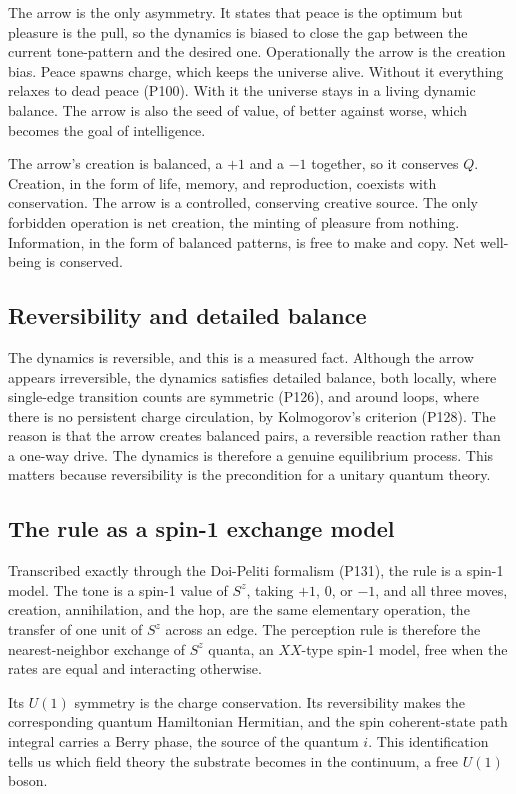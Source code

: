 The arrow is the only asymmetry. It states that peace is the optimum but pleasure is the pull, so the dynamics is biased to close the gap between the current tone-pattern and the desired one. Operationally the arrow is the creation bias. Peace spawns charge, which keeps the universe alive. Without it everything relaxes to dead peace (P100). With it the universe stays in a living dynamic balance. The arrow is also the seed of value, of better against worse, which becomes the goal of intelligence.

The arrow's creation is balanced, a $+1$ and a $-1$ together, so it conserves $Q$. Creation, in the form of life, memory, and reproduction, coexists with conservation. The arrow is a controlled, conserving creative source. The only forbidden operation is net creation, the minting of pleasure from nothing. Information, in the form of balanced patterns, is free to make and copy. Net well-being is conserved.

\subsection{Reversibility and detailed balance}

The dynamics is reversible, and this is a measured fact. Although the arrow appears irreversible, the dynamics satisfies detailed balance, both locally, where single-edge transition counts are symmetric (P126), and around loops, where there is no persistent charge circulation, by Kolmogorov's criterion (P128). The reason is that the arrow creates balanced pairs, a reversible reaction rather than a one-way drive. The dynamics is therefore a genuine equilibrium process. This matters because reversibility is the precondition for a unitary quantum theory.

\subsection{The rule as a spin-1 exchange model}

Transcribed exactly through the Doi-Peliti formalism (P131), the rule is a spin-1 model. The tone is a spin-1 value of $S^z$, taking $+1$, $0$, or $-1$, and all three moves, creation, annihilation, and the hop, are the same elementary operation, the transfer of one unit of $S^z$ across an edge. The perception rule is therefore the nearest-neighbor exchange of $S^z$ quanta, an $XX$-type spin-1 model, free when the rates are equal and interacting otherwise.

Its $U(1)$ symmetry is the charge conservation. Its reversibility makes the corresponding quantum Hamiltonian Hermitian, and the spin coherent-state path integral carries a Berry phase, the source of the quantum $i$. This identification tells us which field theory the substrate becomes in the continuum, a free $U(1)$ boson.

